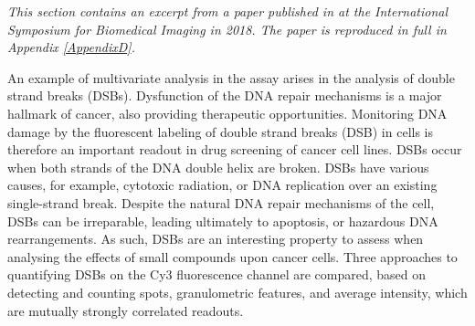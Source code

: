 \emph{This section contains an excerpt from a paper published in at the International Symposium for Biomedical Imaging in 2018. The paper is reproduced in full in Appendix \ref{AppendixD}.}

An example of multivariate analysis in the assay arises in the analysis of double strand breaks (DSBs). Dysfunction of the DNA repair mechanisms is a major hallmark of cancer, also providing therapeutic opportunities. Monitoring DNA damage by the fluorescent labeling of double strand breaks (DSB) in cells is therefore an important readout in drug screening of cancer cell lines. DSBs occur when both strands of the DNA double helix are broken. DSBs have various causes, for example, cytotoxic radiation, or DNA replication over an existing single-strand break. Despite the natural DNA repair mechanisms of the cell, DSBs can be irreparable, leading ultimately to apoptosis, or hazardous DNA rearrangements. As such, DSBs are an interesting property to assess when analysing the effects of small compounds upon cancer cells. Three approaches to quantifying DSBs on the Cy3 fluorescence channel are compared, based on detecting and counting spots, granulometric features, and average intensity, which are mutually strongly correlated readouts.

